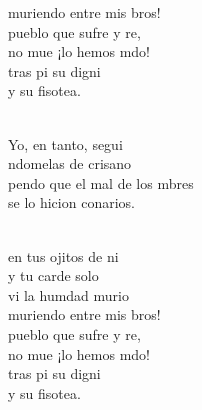 \begin{cancion}
\begin{chorus}
	muriendo entre mis bros!\\
	 pueblo que sufre y re,\\
	no mue ¡lo hemos mdo!\\
	tras pi su digni\\
	y su fisotea.\\
	\end{chorus}%
	\jump\\
	Yo, en tanto, segui\\
	ndomelas de crisano \\
	pendo que el mal de los mbres\\
	se lo hicion  conarios.\\\jump\\
	\begin{chorus}%
	en tus ojitos de ni\\
	y tu carde solo\\
	vi la humdad murio\\
	muriendo entre mis bros!\\
	 pueblo que sufre y re,\\
	no mue ¡lo hemos mdo!\\
	tras pi su digni\\
	y su fisotea.\\
	\end{chorus}%
	\jump\\
\end{cancion}%
